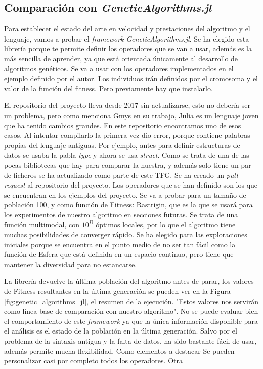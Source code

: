 \subsection{Comparación con \emph{GeneticAlgorithms.jl}}

Para establecer el estado del arte en velocidad y prestaciones del algoritmo y el lenguaje, vamos a probar
el \emph{framework} \emph{GeneticAlgorithms.jl}. Se ha elegido esta librería porque te permite definir los operadores que se van a usar, además es la más sencilla de aprender,
ya que está orientada únicamente al desarrollo de algoritmos genéticos. Se va a usar con los operadores implementados en el ejemplo definido por el autor. Los individuos 
irán definidos por el cromosoma y el valor de la función del fitness. Pero previamente hay que instalarlo.

El repositorio del proyecto lleva desde 2017 sin actualizarse, esto no debería ser un problema, pero como menciona Gmys \cite{comparative_study}
en su trabajo, Julia es un lenguaje joven que ha tenido cambios grandes. En este repositorio encontramos uno de esos casos. Al intentar compilarlo la primera vez dio error, porque contiene
palabras propias del lenguaje antiguas. Por ejemplo, antes para definir estructuras de datos se usaba la pabla \emph{type} y ahora se usa \emph{struct}. Como se trata de una de las pocas 
bibliotecas que hay para comparar la nuestra, y además solo tiene un par de ficheros se ha actualizado como parte de este TFG. Se ha creado un \emph{pull request} al repositorio del proyecto. 
Los operadores que se han definido son los que se encuentran en los ejemplos del proyecto. Se va a probar para un tamaño de población 100, y como función de Fitness: Rastrigin, 
que es la que se usará para los experimentos de nuestro algoritmo en secciones futuras. Se trata de una función multimodal, con $10^{D}$ óptimos locales, por lo que el algoritmo 
tiene muchas posibilidades de converger rápido. Se ha elegido para las exploraciones iniciales porque se encuentra en el punto medio de no ser tan fácil como la función de Esfera 
que está definida en un espacio continuo, pero tiene que mantener la diversidad para
no estancarse.

La librería devuelve la última población del algoritmo antes de parar, los valores de Fitness resultantes en la última generación se pueden ver en la Figura \ref{fig:genetic_algorithms_jl},
el resumen de la ejecución. "Estos valores nos servirán como línea base de comparación con nuestro algoritmo". No se puede evaluar bien el comportamiento de este \emph{framework} ya que 
la única información disponible para el análisis es el estado de la población en la última generación. Salvo por el problema de la sintaxis antigua y la falta de datos,
ha sido bastante fácil de usar, además permite mucha flexibilidad. Como elementos a destacar Se pueden personalizar casi por completo todos los operadores. Otra

